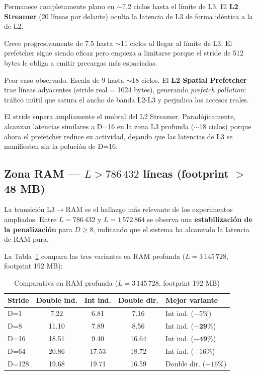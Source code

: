 \documentclass[12pt,a4paper]{article}
\begin{document}
\begin{description}[leftmargin=1.5em]
  \item[$D=1$:] Permanece completamente plano en $\sim$7.2 ciclos hasta el límite de L3. El \textbf{L2 Streamer} (20 líneas por delante) oculta la latencia de L3 de forma idéntica a la de L2.

  \item[$D=8$:] Crece progresivamente de 7.5 hasta $\sim$11 ciclos al llegar al límite de L3. El prefetcher sigue siendo eficaz pero empieza a limitarse porque el stride de 512 bytes le obliga a emitir precargas más espaciadas.

  \item[$D=16$:] Peor caso observado. Escala de 9 hasta $\sim$18 ciclos. El \textbf{L2 Spatial Prefetcher} trae líneas adyacentes (stride real = 1024 bytes), generando \emph{prefetch pollution}: tráfico inútil que satura el ancho de banda L2-L3 y perjudica los accesos reales.

  \item[$D=64, D=128$:] El stride supera ampliamente el umbral del L2 Streamer. Paradójicamente, alcanzan latencias similares a D=16 en la zona L3 profunda ($\sim$18 ciclos) porque ahora el prefetcher reduce su actividad, dejando que las latencias de L3 se manifiesten sin la polución de D=16.
\end{description}

\subsection{Zona RAM — $L > 786\,432$ líneas (footprint $>$ 48 MB)}

La transición L3$\to$RAM es el hallazgo más relevante de los experimentos ampliados. Entre $L=786\,432$ y $L=1\,572\,864$ se observa una \textbf{estabilización de la penalización} para $D \geq 8$, indicando que el sistema ha alcanzado la latencia de RAM pura.

La Tabla~\ref{tab:ram_comparativa} compara las tres variantes en RAM profunda ($L=3\,145\,728$, footprint 192 MB):

\begin{table}[H]
\centering
\caption{Comparativa en RAM profunda ($L=3\,145\,728$, footprint 192 MB)}
\label{tab:ram_comparativa}
\begin{tabular}{lcccl}
\toprule
\textbf{Stride} & \textbf{Double ind.} & \textbf{Int ind.} & \textbf{Double dir.} & \textbf{Mejor variante} \\
\midrule
D=1   & 7.22  & 6.81  & 7.16  & Int ind. ($-5\%$) \\
D=8   & 11.10 & 7.89  & 8.56  & Int ind. ($-\mathbf{29\%}$) \\
D=16  & 18.51 & 9.40  & 16.64 & Int ind. ($-\mathbf{49\%}$) \\
D=64  & 20.86 & 17.53 & 18.72 & Int ind. ($-16\%$) \\
D=128 & 19.68 & 19.71 & 16.59 & Double dir. ($-16\%$) \\
\bottomrule
\end{tabular}
\end{table}
\end{document}
